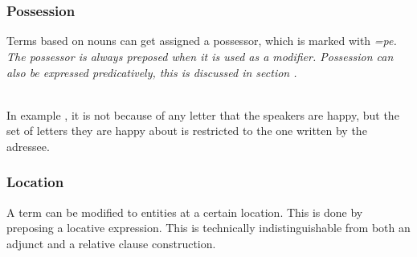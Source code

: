  \\

 \\
\subsubsection{Possession}\label{sec:func:mod:Possession}
Terms based on nouns can get assigned a possessor, which is marked with \em =pe\em{}. The possessor is always preposed when it is used as a modifier. Possession can also be expressed predicatively, this is discussed in section .


\\

In example , it is not because of any letter that the speakers are happy, but the set of letters they are happy about is restricted to the one written by the adressee.

\subsubsection{Location}\label{sec:func:Nmod:Location}
A term can be modified to entities at a certain location. This is done by preposing a locative expression. This is technically indistinguishable from both an adjunct and a relative clause construction.


